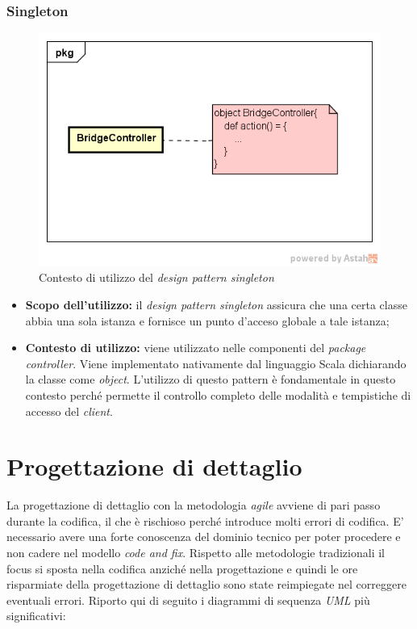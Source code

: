 \subsubsection{Singleton}
\begin{figure}[h]
\centering
\includegraphics[scale=0.50]{immagini/singleton}
\caption{Contesto di utilizzo del \emph{design pattern singleton}}
\label{fig:pattern-singleton}
\end{figure}
\begin{itemize}
\item\textbf{Scopo dell'utilizzo:} il \emph{design pattern singleton} assicura che una certa classe abbia una sola istanza e fornisce un punto d'acceso globale a tale istanza;
\item \textbf{Contesto di utilizzo:} viene utilizzato nelle componenti del \emph{package controller}. Viene implementato nativamente dal linguaggio Scala dichiarando la classe come \emph{object}. L'utilizzo di questo pattern è fondamentale in questo contesto perché permette il controllo completo delle modalità e tempistiche di accesso del \emph{client}.
\end{itemize}



\newpage
\section{Progettazione di dettaglio}%
La progettazione di dettaglio con la metodologia \emph{agile} avviene di pari passo durante la codifica, il che è rischioso perché introduce molti errori di codifica. E' necessario avere una forte conoscenza del dominio tecnico per poter procedere e non cadere nel modello \emph{code and fix}. Rispetto alle metodologie tradizionali il focus si sposta nella codifica anziché nella progettazione e quindi le ore risparmiate della progettazione di dettaglio sono state reimpiegate nel correggere eventuali errori. Riporto qui di seguito i diagrammi di sequenza \emph{UML} più significativi:
